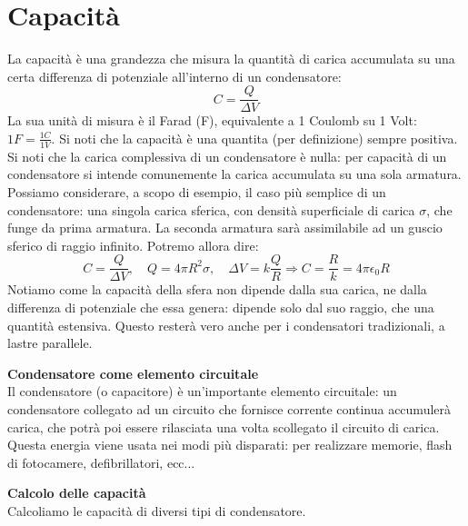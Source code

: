 \documentclass[a4paper,12pt]{article}
\begin{document}
\section{Capacità}
La capacità è una grandezza che misura la quantità di carica accumulata su una certa differenza di potenziale all'interno di un condensatore:
$$ C = \frac{Q}{\Delta V} $$
La sua unità di misura è il Farad (F), equivalente a 1 Coulomb su 1 Volt: $ 1F = \frac{1C}{1V}$. Si noti che la capacità è una quantita (per definizione) sempre positiva. Si noti che la carica complessiva di un condensatore è nulla:
per capacità di un condensatore si intende comunemente la carica accumulata su una sola armatura. Possiamo considerare, a scopo di esempio, il caso più semplice di un condensatore: una singola carica sferica, con
densità superficiale di carica $\sigma$, che funge da prima armatura.
La seconda armatura sarà assimilabile ad un guscio sferico di raggio infinito. Potremo allora dire:
$$ C = \frac{Q}{\Delta V}, \quad Q = 4\pi R^2 \sigma, \quad \Delta V = k\frac{Q}{R} \Rightarrow C = \frac{R}{k} = 4\pi\epsilon_0 R$$
Notiamo come la capacità della sfera non dipende dalla sua carica, ne dalla differenza di potenziale che essa genera: dipende solo dal suo raggio, che una quantità estensiva. Questo resterà vero anche per i condensatori tradizionali, a lastre parallele.
\par\smallskip
\textbf{Condensatore come elemento circuitale} \\
Il condensatore (o capacitore) è un'importante elemento circuitale: un condensatore collegato ad un circuito che fornisce corrente continua accumulerà carica, che potrà poi essere rilasciata una volta scollegato il circuito di carica.
Questa energia viene usata nei modi più disparati: per realizzare memorie, flash di fotocamere, defibrillatori, ecc...
\par\smallskip
\textbf{Calcolo delle capacità} \\
Calcoliamo le capacità di diversi tipi di condensatore.
\end{document}

